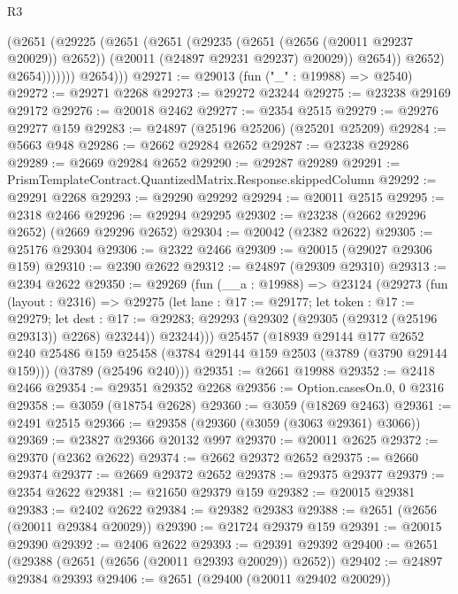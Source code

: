 \begin{lexlean}{R3}
\begin{coremodule}
                        (@2651
                          (@29225
                            (@2651
                              (@2651
                                (@29235 (@2651 (@2656 (@20011 @29237 @20029)) @2652))
                                (@20011 (@24897 @29231 @29237) @20029))
                              @2654))
                          @2652)
                        @2654)))))))
          @2654)))
@29271 := @29013 (fun ("_" : @19988) => @2540)
@29272 := @29271 @2268
@29273 := @29272 @23244
@29275 := @23238 @29169 @29172
@29276 := @20018 @2462
@29277 := @2354 @2515
@29279 := @29276 @29277 @159
@29283 := @24897 (@25196 @25206) (@25201 @25209)
@29284 := @5663 @948
@29286 := @2662 @29284 @2652
@29287 := @23238 @29286
@29289 := @2669 @29284 @2652
@29290 := @29287 @29289
@29291 := PrismTemplateContract.QuantizedMatrix.Response.skippedColumn
@29292 := @29291 @2268
@29293 := @29290 @29292
@29294 := @20011 @2515
@29295 := @2318 @2466
@29296 := @29294 @29295
@29302 := @23238 (@2662 @29296 @2652) (@2669 @29296 @2652)
@29304 := @20042 (@2382 @2622)
@29305 := @25176 @29304
@29306 := @2322 @2466
@29309 := @20015 (@29027 @29306 @159)
@29310 := @2390 @2622
@29312 := @24897 (@29309 @29310)
@29313 := @2394 @2622
@29350 := @29269
    (fun (__a : @19988) =>
    @23124
      (@29273
        (fun (layout : @2316) =>
        @29275
          (let lane : @17 := @29177;
          let token : @17 := @29279;
          let dest : @17 := @29283; @29293 (@29302 (@29305 (@29312 (@25196 @29313)) @2268) @23244))
          @23244)))
    @25457
    (@18939
      @29144
      @177
      @2652
      @240
      @25486
      @159
      @25458
      (@3784 @29144 @159 @2503 (@3789 (@3790 @29144 @159)))
      (@3789 (@25496 @240)))
@29351 := @2661 @19988
@29352 := @2418 @2466
@29354 := @29351 @29352 @2268
@29356 := Option.casesOn.{0, 0} @2316
@29358 := @3059 (@18754 @2628)
@29360 := @3059 (@18269 @2463)
@29361 := @2491 @2515
@29366 := @29358 (@29360 (@3059 (@3063 @29361) @3066))
@29369 := @23827 @29366 @20132 @997
@29370 := @20011 @2625
@29372 := @29370 (@2362 @2622)
@29374 := @2662 @29372 @2652
@29375 := @2660 @29374
@29377 := @2669 @29372 @2652
@29378 := @29375 @29377
@29379 := @2354 @2622
@29381 := @21650 @29379 @159
@29382 := @20015 @29381
@29383 := @2402 @2622
@29384 := @29382 @29383
@29388 := @2651 (@2656 (@20011 @29384 @20029))
@29390 := @21724 @29379 @159
@29391 := @20015 @29390
@29392 := @2406 @2622
@29393 := @29391 @29392
@29400 := @2651 (@29388 (@2651 (@2656 (@20011 @29393 @20029)) @2652))
@29402 := @24897 @29384 @29393
@29406 := @2651 (@29400 (@20011 @29402 @20029))

\end{coremodule}
\end{lexlean}
